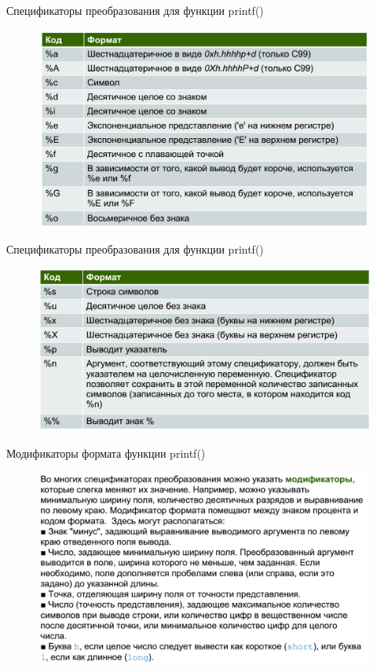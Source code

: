 \documentclass{beamer}
\begin{document}
\begin{frame}{Спецификаторы преобразования для функции printf()}
\begin{figure}[h]
\centering
\includegraphics[scale=0.4]{images/lec02-pic28.png}
\end{figure}
\end{frame}

\begin{frame}{Спецификаторы преобразования для функции printf()}
\begin{figure}[h]
\centering
\includegraphics[scale=0.4]{images/lec02-pic29.png}
\end{figure}
\end{frame}

\begin{frame}{Модификаторы формата функции printf()}
\begin{figure}[h]
\centering
\includegraphics[scale=0.4]{images/lec02-pic30.png}
\end{figure}
\end{frame}
\end{document}
